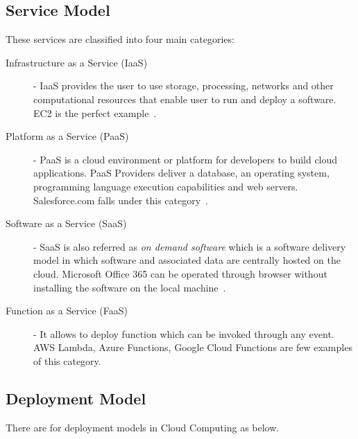\subsection{Service Model} These services are classified into four main categories: 

\begin{description}

\item[Infrastructure as a Service (IaaS)] - IaaS provides the user
to use storage, processing, networks and other computational resources
that enable user to run and deploy a software. EC2 is the perfect
example~\cite{hid-sp18-513-cloud2}. 

\item[Platform as a Service (PaaS)] - PaaS is a cloud environment or
platform for developers to build cloud applications. PaaS Providers
deliver a database, an operating system, programming language execution
capabilities and web servers. Salesforce.com falls under this 
category~\cite{hid-sp18-513-cloud2}.  

\item[Software as a Service (SaaS)] - SaaS is also referred as
\emph{on demand software} which is a software delivery model in which 
software and associated data are centrally hosted on the cloud. 
Microsoft Office 365 can be operated through browser 
without installing the software on the local machine~\cite{hid-sp18-513-cloud2}. 

\item[Function as a Service (FaaS)] - It allows to deploy function which 
can be invoked through any event. AWS Lambda, Azure Functions, Google 
Cloud Functions are few examples of this category.
\end{description}

\subsection{Deployment Model} There are for deployment models in Cloud
Computing as below.

